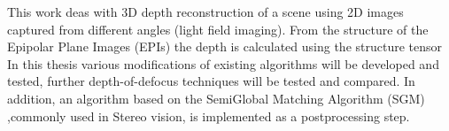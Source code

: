 This work deas with 3D depth reconstruction of a scene using 2D images captured from different angles (light field imaging). From the structure of the Epipolar Plane Images (EPIs) the depth is calculated using the structure tensor In this thesis various modifications of existing algorithms will be developed and tested, further depth-of-defocus techniques will be tested and compared. In addition, an algorithm based on the SemiGlobal Matching Algorithm (SGM) ,commonly used in Stereo vision, is implemented as a postprocessing step.